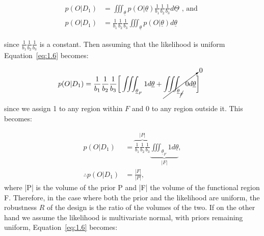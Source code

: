 \begin{align}
p(O|D_1) &= \displaystyle \iiint_{\underline{\theta}} p(O|\underline{\theta})\frac{1}{b_1}\frac{1}{b_2}\frac{1}{b_3}d\underline{\Theta} \text{ , and }\\
p(O|D_1) &= \frac{1}{b_1}\frac{1}{b_2}\frac{1}{b_3} \displaystyle \iiint_{\underline{\theta}}p(O|\underline{\theta})d\underline{\theta} \label{eq:1.6}
\end{align}

\noindent since $\frac{1}{b_1}\frac{1}{b_2}\frac{1}{b_3} $ is a constant. Then assuming that the likelihood is uniform Equation~\ref{eq:1.6} becomes:

\begin{align}
p(O|D_1) &= \frac{1}{b_1}\frac{1}{b_2}\frac{1}{b_3} \bigg[\displaystyle \iiint_{\underline{\theta}_F} 1 d\underline{\theta} +\cancelto{0}{\displaystyle \iiint_{\underline{\theta}_{\cancel{F} }} 0 d\underline{\theta}}\bigg]  
\end{align}

\noindent since we assign 1 to any region within $F$ and 0 to any region outside it. This becomes:

\begin{align}
p(O|D_1) &= \overbrace{\frac{1}{b_1}\frac{1}{b_2}\frac{1}{b_3}}^{|P|} \underbrace{\displaystyle \iiint_{\underline{\theta}_F} 1 d\underline{\theta}}_{|F|}, \\
\therefore p(O|D_1) &= \frac{|F|}{|P|},
\end{align}
where |P| is the volume of the prior P and |F| the volume of the functional region F. Therefore, in the case where both the prior and the likelihood are uniform, the robustness $R$ of the design is the ratio of the volumes of the two. If on the other hand we assume the likelihood is multivariate normal, with priors remaining uniform, Equation~\ref{eq:1.6} becomes: 




